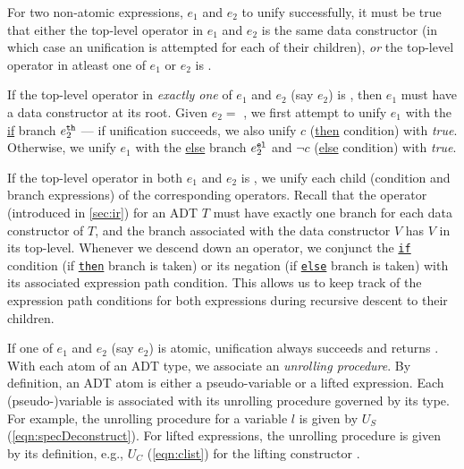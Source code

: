 For two non-atomic expressions, $e_1$ and $e_2$ to unify successfully,
it must be true that either the top-level operator in $e_1$ and $e_2$ is
the same data constructor (in which case an unification is attempted for each
of their children), {\em or} the top-level operator in atleast one of $e_1$ or $e_2$ is \sumDtor{}.

If the top-level operator in {\em exactly one} of $e_1$ and $e_2$ (say $e_2$) is \sumDtor{},
then $e_1$ must have a data constructor at its root.
Given $e_2 = $   ,
we first attempt to unify $e_1$ with the \underline{if} branch $e_2^{\tt th}$ --- if unification succeeds,
we also unify $c$ (\underline{then} condition) with {\em true}.
Otherwise, we unify $e_1$ with the \underline{else} branch $e_2^{\tt el}$ and $\neg c$ (\underline{else} condition) with {\em true}.

If the top-level operator in both $e_1$ and $e_2$ is \sumDtor{},
we unify each child (condition and branch expressions) of the corresponding
\sumDtor{} operators.
Recall that the \sumDtor{} operator (introduced in \cref{sec:ir}) for an ADT $T$ must have exactly one branch
for each data constructor of $T$, and the branch associated with the data constructor $V$
has $V$ in its top-level.
Whenever we descend down an \sumDtor{} operator, we conjunct the \underline{\tt if} condition (if \underline{\tt then} branch is taken)
or its negation (if \underline{\tt else} branch is taken) with its associated expression path condition.
This allows us to keep track of the expression path conditions for both expressions
during recursive descent to their children.

If one of $e_1$ and $e_2$ (say $e_2$) is atomic,
unification always succeeds and returns .
With each atom of an ADT type, we associate an {\em unrolling procedure}.
By definition, an ADT atom is either a pseudo-variable or a lifted expression.
Each (pseudo-)variable is associated with its unrolling procedure governed by its type.
For example, the unrolling procedure for a  variable $l$ is given by $U_S$ (\cref{eqn:specDeconstruct}).
For lifted expressions, the unrolling procedure is given by its definition, e.g., $U_C$ (\cref{eqn:clist})
for the lifting constructor .

